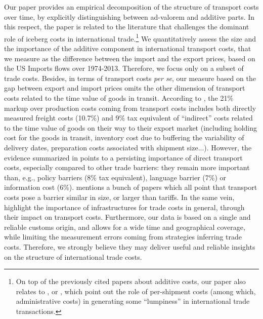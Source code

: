\documentclass[a4paper,11pt]{article}
\begin{document}
Our paper provides an empirical decomposition of the structure of transport costs over time, by explicitly distinguishing between ad-valorem and additive parts. In this respect, the paper is related to the literature that challenges the dominant role of iceberg costs in international trade.\footnote{On top of the previously cited papers about additive costs, our paper also relates to \citet{Alessandria-et-al-AER-2010}, \citet{Hornok-et-al-RES-2015} or \citet{Hornok-et-al-JIE-2015}, which point out the role of per-shipment costs (among which, administrative costs) in generating some ``lumpiness'' in international trade transactions.}
We quantitatively assess the size and the importance of the additive component in international transport costs, that we measure as the difference between the import and the export prices, based on the US Imports flows over 1974-2013. Therefore, we focus only on a subset of trade costs. Besides, in terms of transport costs \textit{per se}, our measure based on the gap between export and import prices omits the other dimension of transport costs related to the time value of goods in transit. According to \citet{anderson_wincoop_jel}, the 21\% markup over production costs coming from transport costs includes both directly measured freight costs (10.7\%) and 9\% tax equivalent of ``indirect'' costs related to the time value of goods on their way to their export market (including holding cost for the goods in transit, inventory cost due to buffering the variability of delivery dates, preparation costs associated with shipment size...). However, the evidence summarized in \citet{anderson_wincoop_jel} points to a persisting importance of direct transport costs, especially compared to other trade barriers: they remain more important than, e.g., policy barriers (8\% tax equivalent), language barrier (7\%) or information cost (6\%). \citet{Hummels_1999} mentions a bunch of papers which all point that transport costs pose a barrier similar in size, or larger than tariffs. In the same vein, \citet{limao_venables} highlight the importance of infrastructures for trade costs in general, through their impact on transport costs. Furthermore, our data is based on a single and reliable customs origin, and allows for a wide time and geographical coverage, while limiting the measurement errors coming from strategies inferring trade costs. Therefore, we strongly believe they may deliver useful and reliable insights on the structure of international trade costs.
\end{document}
